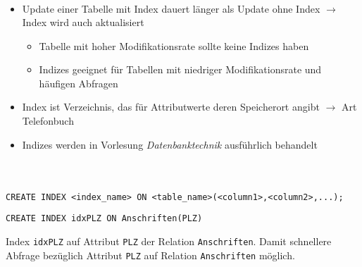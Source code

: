 \begin{frame}[fragile]
\frametitle{\insertsection}\framesubtitle{\insertsubsection}
\\[4pt]
\begin{itemize}
\item Update einer Tabelle mit Index dauert l\"anger als Update ohne Index $\rightarrow$ Index wird auch aktualisiert
\begin{itemize}
	\item Tabelle mit hoher Modifikationsrate sollte keine Indizes haben
	\item Indizes geeignet f\"ur Tabellen mit niedriger Modifikationsrate und h\"aufigen Abfragen 
\end{itemize}
\item Index ist Verzeichnis, das f\"ur Attributwerte deren Speicherort angibt 
$\rightarrow$ Art Telefonbuch
\item Indizes werden in Vorlesung \textit{Datenbanktechnik} ausführlich behandelt
\end{itemize}
\abs
\end{frame}

\begin{frame}[fragile]
\frametitle{\insertsection}\framesubtitle{\insertsubsection}
\onslide
{}\\[4pt]
\begin{lstlisting}[xleftmargin=3ex,numbers=none]
CREATE INDEX <index_name> ON <table_name>(<column1>,<column2>,...); 
\end{lstlisting}
\pause\abs
{}
\begin{lstlisting}[xleftmargin=3ex,numbers=none]
CREATE INDEX idxPLZ ON Anschriften(PLZ)
\end{lstlisting}
Index \texttt{idxPLZ} auf Attribut \texttt{PLZ} der Relation \texttt{Anschriften}.
\nl
Damit schnellere Abfrage bez\"uglich Attribut \texttt{PLZ} auf Relation \texttt{Anschriften} m\"oglich.
\end{frame}


